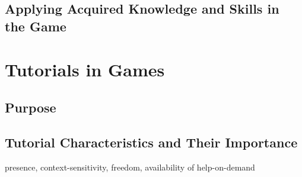 \subsection{Applying Acquired Knowledge and Skills in the Game}




\section{Tutorials in Games}
\label{sec:tutorials_in_games}


\subsection{Purpose}

\subsection{Tutorial Characteristics and Their Importance}

presence, context-sensitivity, freedom, availability of help-on-demand





